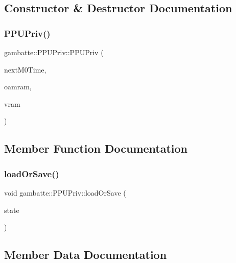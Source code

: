\subsection{Constructor \& Destructor Documentation}
\mbox{\label{structgambatte_1_1PPUPriv_a8d7ac334a03adf6ac17861c62f9d1143}} 
\subsubsection{\texorpdfstring{P\+P\+U\+Priv()}{PPUPriv()}}
{\footnotesize\ttfamily gambatte\+::\+P\+P\+U\+Priv\+::\+P\+P\+U\+Priv (\begin{DoxyParamCaption}\item[{\hyperlink{classgambatte_1_1NextM0Time}{Next\+M0\+Time} \&}]{next\+M0\+Time,  }\item[{unsigned char const $\ast$}]{oamram,  }\item[{unsigned char const $\ast$}]{vram }\end{DoxyParamCaption})}



\subsection{Member Function Documentation}
\mbox{\label{structgambatte_1_1PPUPriv_a2d8e18da564e1da4b91c7fac4a11c4a3}} 
\subsubsection{\texorpdfstring{load\+Or\+Save()}{loadOrSave()}}
{\footnotesize\ttfamily void gambatte\+::\+P\+P\+U\+Priv\+::load\+Or\+Save (\begin{DoxyParamCaption}\item[{\hyperlink{classgambatte_1_1loadsave}{loadsave} \&}]{state }\end{DoxyParamCaption})}



\subsection{Member Data Documentation}
\mbox{\label{structgambatte_1_1PPUPriv_aaf0ca257e082d1eb7ce037e30732893e}} 
